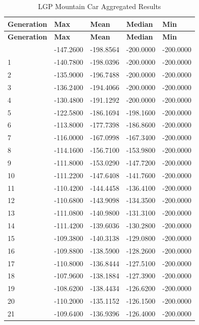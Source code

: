 \begin{longtable}{|l|l|l|l|l|}
\caption{LGP Mountain Car Aggregated Results}\label{tab:mountain-car-lgp}\\\hline
\textbf{Generation} & \textbf{Max} & \textbf{Mean} & \textbf{Median} & \textbf{Min} \\\hline
\endfirsthead
\hline
\textbf{Generation} & \textbf{Max} & \textbf{Mean} & \textbf{Median} & \textbf{Min} \\\hline
\endhead
\hline
\endfoot
0 & -147.2600 & -198.8564 & -200.0000 & -200.0000 \\\hline
1 & -140.7800 & -198.0396 & -200.0000 & -200.0000 \\\hline
2 & -135.9000 & -196.7488 & -200.0000 & -200.0000 \\\hline
3 & -136.2400 & -194.4066 & -200.0000 & -200.0000 \\\hline
4 & -130.4800 & -191.1292 & -200.0000 & -200.0000 \\\hline
5 & -122.5800 & -186.1694 & -198.1600 & -200.0000 \\\hline
6 & -113.8000 & -177.7398 & -186.8600 & -200.0000 \\\hline
7 & -116.0000 & -167.0998 & -167.3400 & -200.0000 \\\hline
8 & -114.1600 & -156.7100 & -153.9800 & -200.0000 \\\hline
9 & -111.8000 & -153.0290 & -147.7200 & -200.0000 \\\hline
10 & -111.2200 & -147.6408 & -141.7600 & -200.0000 \\\hline
11 & -110.4200 & -144.4458 & -136.4100 & -200.0000 \\\hline
12 & -110.6800 & -143.9098 & -134.3500 & -200.0000 \\\hline
13 & -111.0800 & -140.9800 & -131.3100 & -200.0000 \\\hline
14 & -111.4200 & -139.6036 & -130.2800 & -200.0000 \\\hline
15 & -109.3800 & -140.3138 & -129.0800 & -200.0000 \\\hline
16 & -109.8800 & -138.5900 & -128.2600 & -200.0000 \\\hline
17 & -110.8000 & -136.8444 & -127.5100 & -200.0000 \\\hline
18 & -107.9600 & -138.1884 & -127.3900 & -200.0000 \\\hline
19 & -108.6200 & -138.4434 & -126.6200 & -200.0000 \\\hline
20 & -110.2000 & -135.1152 & -126.1500 & -200.0000 \\\hline
21 & -109.6400 & -136.9396 & -126.4000 & -200.0000 \\\hline

\end{longtable}
